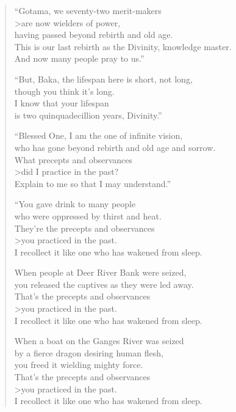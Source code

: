 \documentclass[12pt,openany]{book}%
\begin{document}
\begin{verse}%
“Gotama, we seventy-two merit-makers \\>are now wielders of power, \\
having passed beyond rebirth and old age. \\
This is our last rebirth as the Divinity, knowledge master. \\
And now many people pray to us.” 

“But, Baka, the lifespan here is short, not long, \\
though you think it’s long. \\
I know that your lifespan \\
is two quinquadecillion years, Divinity.” 

“Blessed One, I am the one of infinite vision, \\
who has gone beyond rebirth and old age and sorrow. \\
What precepts and observances \\>did I practice in the past? \\
Explain to me so that I may understand.” 

“You gave drink to many people \\
who were oppressed by thirst and heat. \\
They’re the precepts and observances \\>you practiced in the past. \\
I recollect it like one who has wakened from sleep. 

When people at Deer River Bank were seized, \\
you released the captives as they were led away. \\
That’s the precepts and observances \\>you practiced in the past. \\
I recollect it like one who has wakened from sleep. 

When a boat on the Ganges River was seized \\
by a fierce dragon desiring human flesh, \\
you freed it wielding mighty force. \\
That’s the precepts and observances \\>you practiced in the past. \\
I recollect it like one who has wakened from sleep. 


\end{verse}
\end{document}
